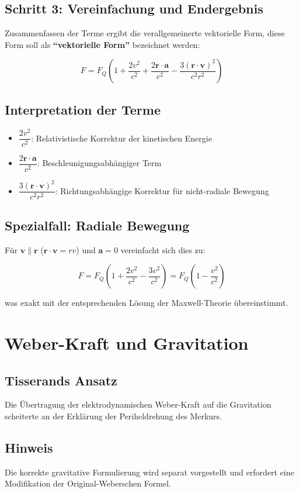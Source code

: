 \subsection{Schritt 3: Vereinfachung und Endergebnis}

Zusammenfassen der Terme ergibt die verallgemeinerte vektorielle Form, diese Form soll als \textbf{\enquote{vektorielle Form}} bezeichnet werden:

\begin{equation}
    \boxed
    {
        F = F_Q \left(1 + \frac{2v^2}{c^2} + \frac{2\mathbf{r}\cdot\mathbf{a}}{c^2} - \frac{3(\mathbf{r}\cdot\mathbf{v})^2}{c^2 r^2}\right)
    }
\end{equation}

\subsection{Interpretation der Terme}

\begin{itemize}
\item $\dfrac{2v^2}{c^2}$: Relativistische Korrektur der kinetischen Energie
\item $\dfrac{2\mathbf{r}\cdot\mathbf{a}}{c^2}$: Beschleunigungsabhängiger Term
\item $\dfrac{3(\mathbf{r}\cdot\mathbf{v})^2}{c^2 r^2}$: Richtungsabhängige Korrektur für nicht-radiale Bewegung
\end{itemize}

\subsection{Spezialfall: Radiale Bewegung}

Für $\mathbf{v} \parallel \mathbf{r}$ ($\mathbf{r}\cdot\mathbf{v} = rv$) und $\mathbf{a} = 0$ vereinfacht sich dies zu:

\begin{equation}
F = F_Q \left(1 + \frac{2v^2}{c^2} - \frac{3v^2}{c^2}\right) = F_Q \left(1 - \frac{v^2}{c^2}\right)
\end{equation}

was exakt mit der entsprechenden Lösung der Maxwell-Theorie übereinstimmt.

\section{Weber-Kraft und Gravitation}
\subsection*{Tisserands Ansatz}
Die Übertragung der elektrodynamischen Weber-Kraft \cite{tisserand1894} auf die Gravitation scheiterte an der Erklärung der Periheldrehung des Merkurs.

\subsection*{Hinweis}
Die korrekte gravitative Formulierung wird separat vorgestellt und erfordert eine Modifikation der Original-Weberschen Formel.
